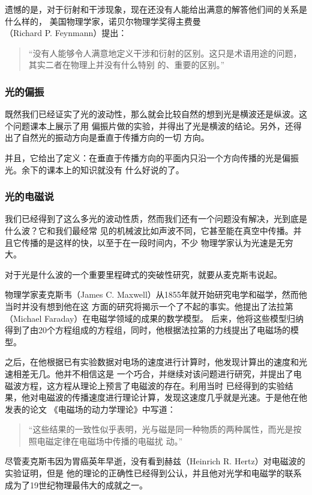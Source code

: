 遗憾的是，对于衍射和干涉现象，现在还没有人能给出满意的解答他们间的关系是什么样的，
美国物理学家，诺贝尔物理学奖得主费曼\\
 （Richard P. Feynmann）提出：
\begin{quote}
``没有人能够令人满意地定义干涉和衍射的区别。这只是术语用途的问题，其实二者在物理上并没有什么特别
的、重要的区别。''
\end{quote}

\subsubsection{光的偏振}
既然我们已经证实了光的波动性，那么就会比较自然的想到光是横波还是纵波。这个问题课本上展示了用
偏振片做的实验，并得出了光是横波的结论。另外，还得出了自然光的振动方向是垂直于传播方向的一切
方向。

并且，它给出了定义：在垂直于传播方向的平面内只沿一个方向传播的光是偏振光。余下的课本上的知识就没有
什么好说的了。

\subsubsection{光的电磁说}
我们已经得到了这么多光的波动性质，然而我们还有一个问题没有解决，光到底是什么波？它和我们最经常
见的机械波比如声波不同，它甚至能在真空中传播。并且它传播的是这样的快，以至于在一段时间内，不少
物理学家认为光速是无穷大。

对于光是什么波的一个重要里程碑式的突破性研究，就要从麦克斯韦说起。

物理学家麦克斯韦（James C. Maxwell）从1855年就开始研究电学和磁学，然而他当时并没有想到他在这
方面的研究将揭示一个了不起的事实。他提出了法拉第（Michael Faraday）在电磁学领域的成果的数学模型。
后来，他将这些模型归纳得到了由20个方程组成的方程组，同时，他根据法拉第的力线提出了电磁场的模型。

之后，在他根据已有实验数据对电场的速度进行计算时，他发现计算出的速度和光速相差无几。他并不相信这是
一个巧合，并继续对该问题进行研究，并提出了电磁波方程，这方程从理论上预言了电磁波的存在。利用当时
已经得到的实验结果，他对电磁波的传播速度进行理论计算，发现这速度几乎就是光速。于是他在他发表的论文
《电磁场的动力学理论》中写道：
\begin{quote}
``这些结果的一致性似乎表明，光与磁是同一种物质的两种属性，而光是按照电磁定律在电磁场中传播的电磁扰
动。''
\end{quote}

尽管麦克斯韦因为胃癌英年早逝，没有看到赫兹（Heinrich R. Hertz）对电磁波的实验证明，但是
他的理论的正确性已经得到公认，并且他对光学和电磁学的联系成为了19世纪物理最伟大的成就之一。

